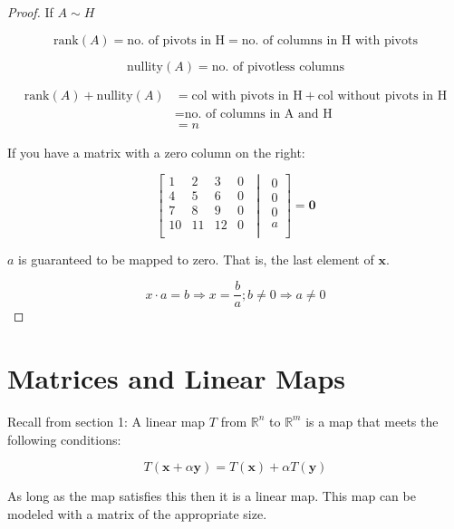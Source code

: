 \documentclass[12pt]{article}
\theoremstyle{plain}
\theoremstyle{remark}
\theoremstyle{definition}
\begin{document}
\begin{proof} If \(A\sim H\)

\[\text{rank}(A) = \text{no.\ of\ pivots\ in\ H} = \text{no.\ of\ columns\ in\ H\ with\ pivots}\]

\[\text{nullity}(A) = \text{no.\ of\ pivotless\ columns}\]

\begin{align*}
\text{rank}(A) + \text{nullity}(A) &= \text{col\ with\ pivots\ in\ H} + \text{col\ without\ pivots\ in\ H} \\
&= \text{no.\ of\ columns\ in\ A\ and\ H} \\
&= n
\end{align*}


If you have a matrix with a zero column on the right:

\[\left\lbrack \begin{matrix}
1 & 2 & 3 & 0 \\
4 & 5 & 6 & 0 \\
7 & 8 & 9 & 0 \\
10 & 11 & 12 & 0 \\
\end{matrix}\;\middle|\;\begin{matrix}
0 \\
0 \\
0 \\
a \\
\end{matrix} \right\rbrack = \mathbf{0}\]

\(a\) is guaranteed to be mapped to zero. That is, the last element of
\(\mathbf{x}\).

\[x \cdot a = b \Rightarrow x = \frac{b}{a};b \neq 0 \Rightarrow a \neq 0\]



\end{proof}
\section{Matrices and Linear Maps}

Recall from section 1: A linear map \(T\) from \(\mathbb{R}^{n}\) to
\(\mathbb{R}^{m}\) is a map that meets the following conditions:

\[T\left( \mathbf{x} + \alpha\mathbf{y} \right) = T\left( \mathbf{x} \right) + \alpha T(\mathbf{y})\]

As long as the map satisfies this then it is a linear map. This map can
be modeled with a matrix of the appropriate size.
\end{document}
